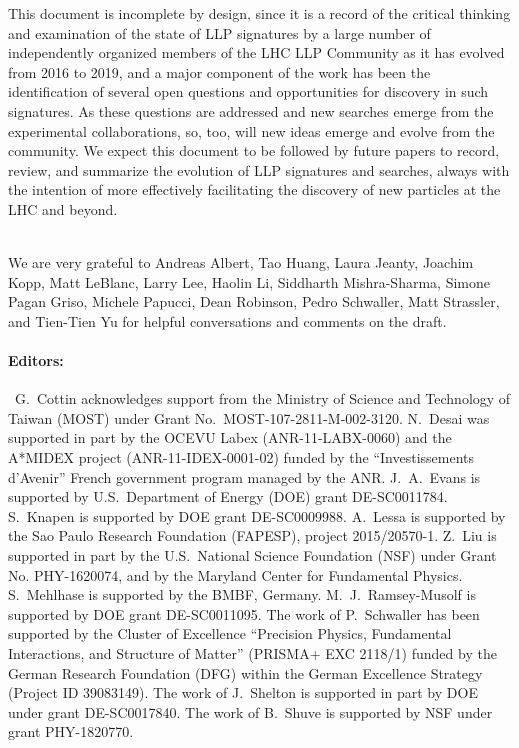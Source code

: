 This document is incomplete by design, since it is a record of the critical thinking and examination of the state of LLP signatures by a large number of independently organized members of the LHC LLP Community as it has evolved from 2016 to 2019, and a major component of the work has been the identification of several open questions and opportunities for discovery in such signatures.
As these questions are addressed and new searches emerge from the experimental collaborations, so, too, will new ideas emerge and evolve from the community.
We expect this document to be followed by future papers to record, review, and summarize the evolution of LLP signatures and searches, always with the intention of more effectively facilitating the discovery of new particles at the LHC and beyond. \\

\vspace{\baselineskip}

\\

We are very grateful to Andreas Albert, Tao Huang, Laura Jeanty, Joachim Kopp, Matt LeBlanc, Larry Lee, Haolin Li, Siddharth Mishra-Sharma, Simone Pagan Griso, Michele Papucci, Dean Robinson, Pedro Schwaller, Matt Strassler, and Tien-Tien Yu for helpful conversations and comments on the draft.\\

\paragraph{Editors:}~G.~Cottin acknowledges support from the Ministry of Science and Technology of Taiwan (MOST) under Grant No.~MOST-107-2811-M-002-3120. N.~Desai was supported in part by the OCEVU Labex (ANR-11-LABX-0060) and the A*MIDEX project (ANR-11-IDEX-0001-02) funded by the ``Investissements d'Avenir'' French government program managed by the ANR. J.~A.~Evans is supported by U.S.~Department of Energy (DOE) grant DE-SC0011784. S.~Knapen is supported by DOE grant DE-SC0009988. A.~Lessa is supported by the Sao Paulo Research Foundation (FAPESP), project 2015/20570-1. Z.~Liu is supported in part by the U.S.~National Science Foundation (NSF) under Grant No. PHY-1620074, and by the Maryland Center for Fundamental Physics. S.~Mehlhase is supported by the BMBF, Germany. M.~J.~Ramsey-Musolf is supported by DOE grant DE-SC0011095. The work of P.~Schwaller has been supported by the Cluster of Excellence ``Precision Physics, Fundamental Interactions, and Structure of Matter'' (PRISMA+ EXC 2118/1) funded by the German Research Foundation (DFG) within the German Excellence Strategy (Project ID 39083149). The work of J.~Shelton is supported in part by DOE under grant DE-SC0017840. The work of B.~Shuve is supported by NSF under grant PHY-1820770.\\

